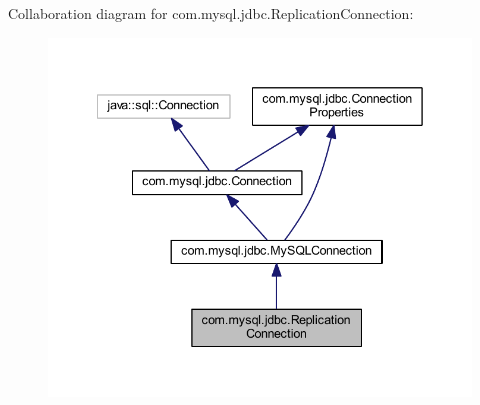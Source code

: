 Collaboration diagram for com.\+mysql.\+jdbc.\+Replication\+Connection\+:
\nopagebreak
\begin{figure}[H]
\begin{center}
\leavevmode
\includegraphics[width=342pt]{interfacecom_1_1mysql_1_1jdbc_1_1_replication_connection__coll__graph}
\end{center}
\end{figure}
